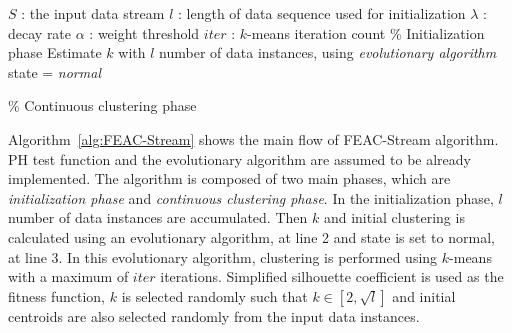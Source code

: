 \documentclass[smallcondensed]{svjour3}     %
\begin{document}
\begin{algorithm}
	\caption{FEAC-Stream (S, $l$, $\lambda$, $\alpha$, $iter$)}
	\label{alg:FEAC-Stream}
	\begin{algorithmic}[1]
		\Require $S$ : the input data stream
		\Require $l$ : length of data sequence used for initialization
		\Require $\lambda$ : decay rate
		\Require $\alpha$ : weight threshold
		\Require $iter$ : $k$-means iteration count
		\State \% Initialization phase
		\State Estimate $k$ with $l$ number of data instances, using \textit{evolutionary algorithm}
		\State state = \textit{normal}
		
		\State \% Continuous clustering phase
		
	\end{algorithmic}
\end{algorithm}

Algorithm~\ref{alg:FEAC-Stream} shows the main flow of FEAC-Stream algorithm. PH test function and the evolutionary algorithm are assumed to be already implemented. The algorithm is composed of two main phases, which are \textit{initialization phase} and \textit{continuous clustering phase}. In the initialization phase, $l$ number of data instances are accumulated. Then $k$ and initial clustering is calculated using an evolutionary algorithm, at line 2 and state is set to normal, at line 3. In this evolutionary algorithm, clustering is performed using $k$-means with a maximum of $iter$ iterations. Simplified silhouette coefficient is used as the fitness function, $k$ is selected randomly such that $k \in [2, \sqrt{l}]$ and initial centroids are also selected randomly from the input data instances.
\end{document}
